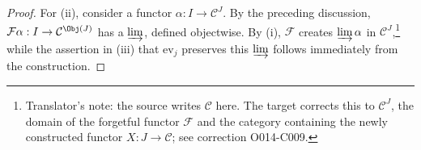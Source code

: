 \begin{proof}
	For (ii), consider a functor $\alpha: I \to \mathcal{C}^J$. By the preceding
	discussion, $\mathcal{F}\alpha: I \to \mathcal{C}^{\Obj(J)}$ has a
	$\varinjlim$, defined objectwise. By (i), $\mathcal{F}$ creates
	$\varinjlim \alpha$ in $\mathcal{C}^J$,\footnote{Translator's note: the
	source writes $\mathcal{C}$ here. The target corrects this to
	$\mathcal{C}^J$, the domain of the forgetful functor $\mathcal{F}$ and the
	category containing the newly constructed functor $X: J \to \mathcal{C}$;
	see correction O014-C009.} while the assertion in (iii) that
	$\mathrm{ev}_j$ preserves this $\varinjlim$ follows immediately from the
	construction.
\end{proof}
